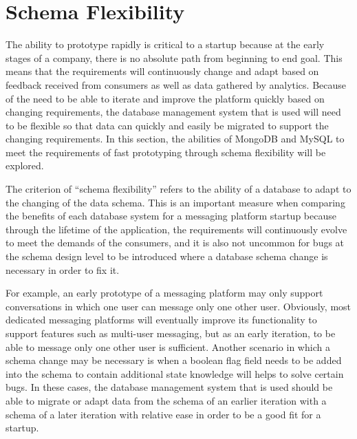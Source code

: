 \documentclass[12pt]{article}
\begin{document}
\section{Schema Flexibility}

The ability to prototype rapidly is critical to a startup because at the early stages of a company, there is no absolute path from beginning to end goal. This means that the requirements will continuously change and adapt based on feedback received from consumers as well as data gathered by analytics. Because of the need to be able to iterate and improve the platform quickly based on changing requirements, the database management system that is used will need to be flexible so that data can quickly and easily be migrated to support the changing requirements. In this section, the abilities of MongoDB and MySQL to meet the requirements of fast prototyping through schema flexibility will be explored.

The criterion of ``schema flexibility'' refers to the ability of a database to adapt to the changing of the data schema. This is an important measure when comparing the benefits of each database system for a messaging platform startup because through the lifetime of the application, the requirements will continuously evolve to meet the demands of the consumers, and it is also not uncommon for bugs at the schema design level to be introduced where a database schema change is necessary in order to fix it.

For example, an early prototype of a messaging platform may only support conversations in which one user can message only one other user. Obviously, most dedicated messaging platforms will eventually improve its functionality to support features such as multi-user messaging, but as an early iteration, to be able to message only one other user is sufficient. Another scenario in which a schema change may be necessary is when a boolean flag field needs to be added into the schema to contain additional state knowledge will helps to solve certain bugs. In these cases, the database management system that is used should be able to migrate or adapt data from the schema of an earlier iteration with a schema of a later iteration with relative ease in order to be a good fit for a startup.
\end{document}
